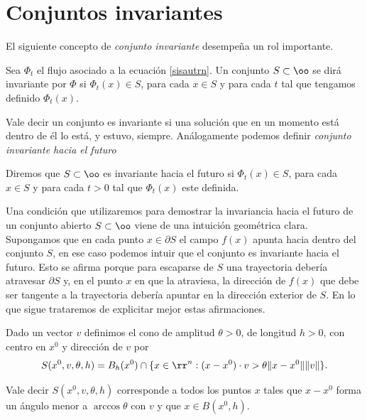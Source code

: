 \section{Conjuntos invariantes}

El siguiente concepto de \emph{conjunto invariante} desempeña un
rol importante.

\begin{definicion} Sea $\Phi_t$ el flujo asociado a la ecuación
\eqref{sisautrn}. Un conjunto $S\subset\oo$ se dirá invariante por
$\Phi$ si $\Phi_t(x)\in S$, para cada $x\in S$ y para cada $t$ tal
que tengamos definido $\Phi_t(x)$.
\end{definicion}
Vale decir un conjunto es invariante si una solución que en un
momento está dentro de él lo está, y estuvo, siempre. Análogamente
podemos definir \emph{conjunto invariante hacia el futuro}

\begin{definicion} Diremos que $S\subset \oo$ es invariante hacia el
futuro si $\Phi_t(x)\in S$, para cada $x\in S$ y para cada $t>0$
tal que $\Phi_t(x)$ este definida.
\end{definicion}

Una condición que utilizaremos para demostrar la invariancia hacia
el futuro de un conjunto abierto $S\subset\oo$ viene de una
intuición geométrica clara. Supongamos que en cada punto $x\in
\partial S$ el campo $f(x)$ apunta hacia dentro del conjunto $S$,
en ese caso podemos intuir que el conjunto es invariante hacia el
futuro. Esto se afirma porque para escaparse de $S$ una
trayectoria debería atravesar $\partial S$ y, en el punto $x$ en
que la atraviesa, la dirección de $f(x)$ que debe ser tangente a
la trayectoria debería apuntar en la dirección exterior de $S$. En
lo que sigue trataremos de explicitar mejor estas afirmaciones.

\begin{definicion} Dado un vector $v$ definimos el
cono de amplitud $\theta>0$, de longitud $h>0$, con
centro en $x^0$ y dirección de $v$ por
\[
    S(x^0,v,\theta,h)=B_h(x^0)\cap\{x\in\rr^n:
    (x-x^0)\cdot v> \theta \|x-x^0\|\|v\|\}.
\]
\end{definicion}
Vale decir $S(x^0,v,\theta,h)$ corresponde a todos los puntos $x$
tales que $x-x^0$ forma un ángulo menor a $\arccos\theta$ con $v$
y que $x\in B(x^0,h)$.

